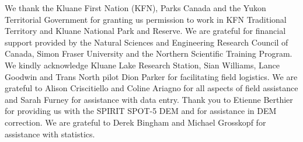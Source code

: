 \documentclass[twocolumn,letterpaper]{igs}
\begin{document}
We thank the Kluane First Nation (KFN), Parks Canada and the Yukon Territorial Government for granting us permission to work in KFN Traditional Territory and Kluane National Park and Reserve. We are grateful for financial support provided by the Natural Sciences and Engineering Research Council of  Canada, Simon Fraser University and the Northern Scientific Training Program. We kindly acknowledge Kluane Lake Research Station, Sian Williams, Lance Goodwin and Trans North pilot Dion Parker for facilitating field logistics. We are grateful to Alison Criscitiello and Coline Ariagno for all aspects of field assistance and Sarah Furney for assistance with data entry. Thank you to Etienne Berthier for providing us with the SPIRIT SPOT-5 DEM and for assistance in DEM correction. We are grateful to Derek Bingham and Michael Grosskopf for assistance with statistics. 



%
%

%


\end{document}
